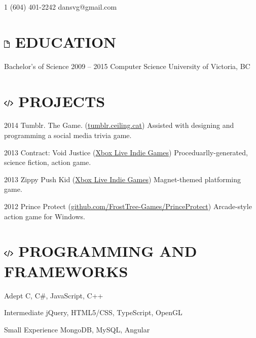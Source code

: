 \documentclass[10pt]{tccv}
\begin{document}
    {1 (604) 401-2242}
    {dansvg@gmail.com}

\section{\includegraphics[height=10pt, keepaspectratio=true]{file} EDUCATION}

\begin{yearlist}

\item[Bachelor's of Science]{2009 -- 2015}
     {Computer Science}
     {University of Victoria, BC}

\end{yearlist}

\section{\includegraphics[height=10pt, keepaspectratio=true]{code} PROJECTS}

\begin{yearlist}

\item{2014}
     {Tumblr. The Game. (\href{http://tumblr.ceiling.cat/}{tumblr.ceiling.cat})}
     {Assisted with designing and programming a social media trivia game.}

\item{2013}
     {Contract: Void Justice (\href{http://marketplace.xbox.com/en-US/Product/Contract-Void-Justice/66acd000-77fe-1000-9115-d80258550d94}{Xbox Live Indie Games})}
     {Proceduarlly-generated, science fiction, action game.}

\item{2013}
     {Zippy Push Kid (\href{http://marketplace.xbox.com/en-ca/Product/Zippy-Push-Kid/66acd000-77fe-1000-9115-d80258550cd6}{Xbox Live Indie Games})}
     {Magnet-themed platforming game.}

\item{2012}
     {Prince Protect (\href{https://github.com/FrostTree-Games/PrinceProtect}{github.com/FrostTree-Games/PrinceProtect})}
     {Arcade-style action game for Windows.}

\end{yearlist}

\section{\includegraphics[height=10pt, keepaspectratio=true]{code} PROGRAMMING AND FRAMEWORKS}

\begin{factlist}

\item{Adept}
     {C, C\#, JavaScript, C++}
     
\item{Intermediate}
	 {jQuery, HTML5/CSS, TypeScript, OpenGL}

\item{Small Experience}
     {MongoDB, MySQL, Angular}

\end{factlist}
\end{document}
